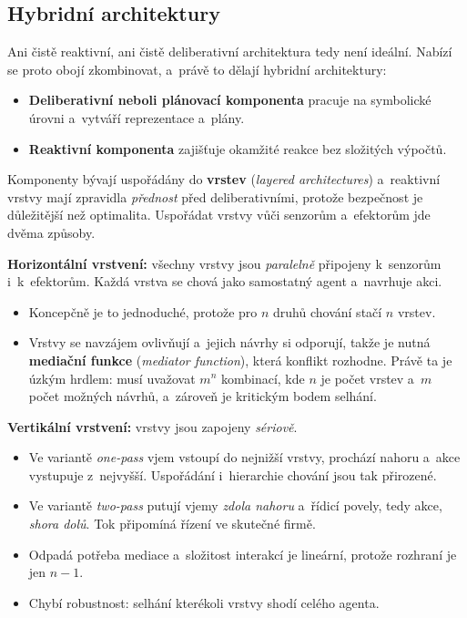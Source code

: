 \documentclass[11pt,a4paper]{article}
\theoremstyle{definition}
\begin{document}
\subsection{Hybridní architektury}
\label{ssec:hybridni}

Ani čistě reaktivní, ani čistě deliberativní architektura tedy není ideální. Nabízí se proto
obojí zkombinovat, a~právě to dělají hybridní architektury:
\begin{itemize}
\item \textbf{Deliberativní neboli plánovací komponenta} pracuje na symbolické úrovni a~vytváří
  reprezentace a~plány.
\item \textbf{Reaktivní komponenta} zajišťuje okamžité reakce bez složitých výpočtů.
\end{itemize}
Komponenty bývají uspořádány do \textbf{vrstev} (\emph{layered architectures}) a~reaktivní
vrstvy mají zpravidla \emph{přednost} před deliberativními, protože bezpečnost je důležitější
než optimalita. Uspořádat vrstvy vůči senzorům a~efektorům jde dvěma způsoby.

\begin{defbox}
\textbf{Horizontální vrstvení:} všechny vrstvy jsou \emph{paralelně} připojeny k~senzorům
i~k~efektorům. Každá vrstva se chová jako samostatný agent a~navrhuje akci.
\begin{itemize}
\item[$+$] Koncepčně je to jednoduché, protože pro $n$ druhů chování stačí $n$ vrstev.
\item[$-$] Vrstvy se navzájem ovlivňují a~jejich návrhy si odporují, takže je nutná
  \textbf{mediační funkce} (\emph{mediator function}), která konflikt rozhodne.
  Právě ta je úzkým hrdlem: musí uvažovat $m^n$ kombinací, kde $n$ je počet vrstev a~$m$ počet
  možných návrhů, a~zároveň je kritickým bodem selhání.
\end{itemize}

\textbf{Vertikální vrstvení:} vrstvy jsou zapojeny \emph{sériově}.
\begin{itemize}
\item Ve variantě \emph{one-pass} vjem vstoupí do nejnižší vrstvy, prochází nahoru a~akce
  vystupuje z~nejvyšší. Uspořádání i~hierarchie chování jsou tak přirozené.
\item Ve variantě \emph{two-pass} putují vjemy \emph{zdola nahoru} a~řídicí povely, tedy akce,
  \emph{shora dolů}. Tok připomíná řízení ve skutečné firmě.
\item[$+$] Odpadá potřeba mediace a~složitost interakcí je lineární, protože rozhraní je
  jen $n-1$.
\item[$-$] Chybí robustnost: selhání kterékoli vrstvy shodí celého agenta.
\end{itemize}
\end{defbox}
\end{document}

